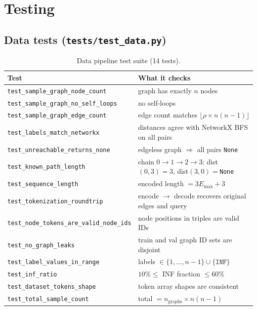 \documentclass[11pt, a4paper]{article}
\begin{document}
\section{Testing}

\subsection{Data tests (\texttt{tests/test\_data.py})}

\begin{table}[H]
\centering
\begin{tabular}{@{}ll@{}}
\toprule
Test & What it checks \\
\midrule
\texttt{test\_sample\_graph\_node\_count}     & graph has exactly $n$ nodes \\
\texttt{test\_sample\_graph\_no\_self\_loops} & no self-loops \\
\texttt{test\_sample\_graph\_edge\_count}     & edge count matches $\lfloor \rho \times n(n-1) \rfloor$ \\
\texttt{test\_labels\_match\_networkx}        & distances agree with NetworkX BFS on all pairs \\
\texttt{test\_unreachable\_returns\_none}     & edgeless graph $\Rightarrow$ all pairs \texttt{None} \\
\texttt{test\_known\_path\_length}            & chain $0\to1\to2\to3$: dist$(0,3)=3$, dist$(3,0)=$\texttt{None} \\
\texttt{test\_sequence\_length}              & encoded length $= 3E_{\max} + 3$ \\
\texttt{test\_tokenization\_roundtrip}       & encode $\to$ decode recovers original edges and query \\
\texttt{test\_node\_tokens\_are\_valid\_node\_ids} & node positions in triples are valid IDs \\
\texttt{test\_no\_graph\_leaks}              & train and val graph ID sets are disjoint \\
\texttt{test\_label\_values\_in\_range}      & labels $\in \{1,\ldots,n-1\} \cup \{\texttt{INF}\}$ \\
\texttt{test\_inf\_ratio}                    & $10\% \leq$ INF fraction $\leq 60\%$ \\
\texttt{test\_dataset\_tokens\_shape}        & token array shapes are consistent \\
\texttt{test\_total\_sample\_count}          & total $= n_{\text{graphs}} \times n(n-1)$ \\
\bottomrule
\end{tabular}
\caption{Data pipeline test suite (14 tests).}
\end{table}
\end{document}
